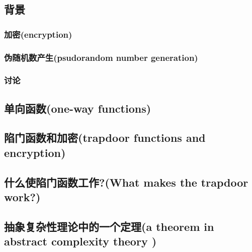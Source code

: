\documentclass[]{article}
\begin{document}
\subsection{背景}
\subsubsection{加密(encryption)}

\subsubsection{伪随机数产生(psudorandom number generation)}

\subsubsection{讨论}

\subsection{单向函数(one-way functions)}

\subsection{陷门函数和加密(trapdoor functions and encryption)}

\subsection{什么使陷门函数工作?(What makes the trapdoor work?)}

\subsection{抽象复杂性理论中的一个定理(a theorem in abstract complexity theory )}
\end{document}
